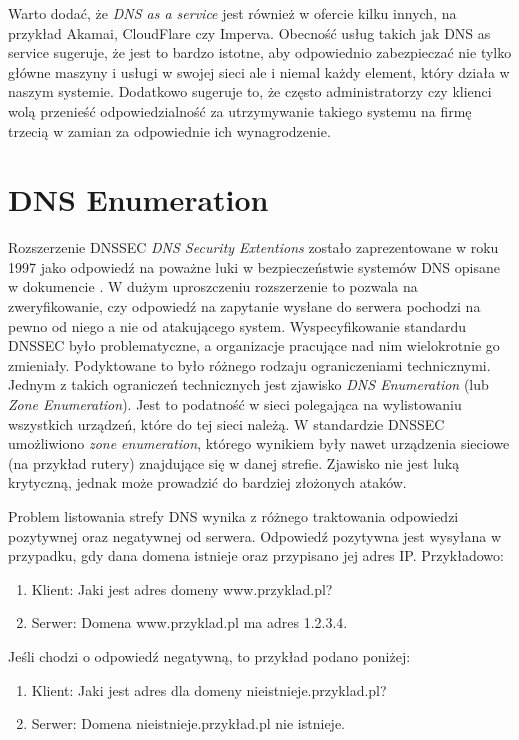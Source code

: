 Warto dodać, że \textit{DNS as a service} jest również w ofercie kilku innych, na przykład Akamai\cite{akamai}, CloudFlare\cite{cloudflare} czy Imperva\cite{incapsula}. Obecność usług takich jak DNS as service sugeruje, że jest to bardzo istotne, aby odpowiednio zabezpieczać nie tylko główne maszyny i usługi w swojej sieci ale i niemal każdy element, który działa w naszym systemie. Dodatkowo sugeruje to, że często administratorzy czy klienci wolą przenieść odpowiedzialność za utrzymywanie takiego systemu na firmę trzecią w zamian za odpowiednie ich wynagrodzenie.

\section{DNS Enumeration}
Rozszerzenie DNSSEC \textit{DNS Security Extentions} zostało zaprezentowane w roku 1997\cite{RFC2065} jako odpowiedź na poważne luki w bezpieczeństwie systemów DNS opisane w dokumencie \cite{DNSsecurityProblem}. W dużym uproszczeniu rozszerzenie to pozwala na zweryfikowanie, czy odpowiedź na zapytanie wysłane do serwera pochodzi na pewno od niego a nie od atakującego system. Wyspecyfikowanie standardu DNSSEC było problematyczne, a organizacje pracujące nad nim wielokrotnie go zmieniały. Podyktowane to było różnego rodzaju ograniczeniami technicznymi. Jednym z takich ograniczeń technicznych jest zjawisko \textit{DNS Enumeration} (lub \textit{Zone Enumeration}). Jest to podatność w sieci polegająca na wylistowaniu wszystkich urządzeń, które do tej sieci należą. W standardzie DNSSEC umożliwiono \textit{zone enumeration}, którego wynikiem były nawet urządzenia sieciowe (na przykład rutery) znajdujące się w danej strefie. Zjawisko nie jest luką krytyczną, jednak może prowadzić do bardziej złożonych ataków. 

Problem listowania strefy DNS wynika z różnego traktowania odpowiedzi pozytywnej oraz negatywnej od serwera. Odpowiedź pozytywna jest wysyłana w przypadku, gdy dana domena istnieje oraz przypisano jej adres IP. Przykładowo:
\begin{enumerate}
	\item Klient: Jaki jest adres domeny www.przyklad.pl?
	\item Serwer: Domena www.przyklad.pl ma adres 1.2.3.4.
\end{enumerate} 
Jeśli chodzi o odpowiedź negatywną, to przykład podano poniżej:
\begin{enumerate}
	\item Klient: Jaki jest adres dla domeny nieistnieje.przyklad.pl?
	\item Serwer: Domena nieistnieje.przykład.pl nie istnieje.
\end{enumerate}

